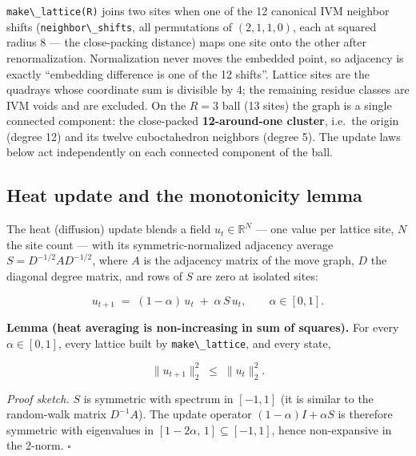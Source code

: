 \documentclass[
  10pt,
]{article}
\newcommand{\passthrough}[1]{#1}
\begin{document}
\passthrough{\lstinline!make\_lattice(R)!} joins two sites when one of
the 12 canonical IVM neighbor shifts
(\passthrough{\lstinline!neighbor\_shifts!}, all permutations of
\((2,1,1,0)\), each at squared radius 8 --- the close-packing distance)
maps one site onto the other after renormalization. Normalization never
moves the embedded point, so adjacency is exactly ``embedding difference
is one of the 12 shifts''. Lattice sites are the quadrays whose
coordinate sum is divisible by 4; the remaining residue classes are IVM
voids and are excluded. On the \(R = 3\) ball (13 sites) the graph is a
single connected component: the close-packed \textbf{12-around-one
cluster}, i.e.~the origin (degree 12) and its twelve cuboctahedron
neighbors (degree 5). The update laws below act independently on each
connected component of the ball.

\subsection{Heat update and the monotonicity
lemma}\label{heat-update-and-the-monotonicity-lemma}

The heat (diffusion) update blends a field \(u_t \in \mathbb{R}^{N}\)
--- one value per lattice site, \(N\) the site count --- with its
symmetric-normalized adjacency average \(S = D^{-1/2} A D^{-1/2}\),
where \(A\) is the adjacency matrix of the move graph, \(D\) the
diagonal degree matrix, and rows of \(S\) are zero at isolated sites:

\begin{equation}
\label{eq:ivmdyn-heat}
u_{t+1} \;=\; (1-\alpha)\, u_t \;+\; \alpha\, S\, u_t ,
\qquad \alpha \in [0,1] .
\end{equation}

\textbf{Lemma (heat averaging is non-increasing in sum of squares).} For
every \(\alpha \in [0,1]\), every lattice built by
\passthrough{\lstinline!make\_lattice!}, and every state,

\begin{equation}
\label{eq:ivmdyn-lemma}
\lVert u_{t+1} \rVert_2^2 \;\le\; \lVert u_t \rVert_2^2 .
\end{equation}

\emph{Proof sketch.} \(S\) is symmetric with spectrum in \([-1,1]\) (it
is similar to the random-walk matrix \(D^{-1}A\)). The update operator
\((1-\alpha)I + \alpha S\) is therefore symmetric with eigenvalues in
\([1-2\alpha,\,1] \subseteq [-1,1]\), hence non-expansive in the 2-norm.
\(\square\)
\end{document}
